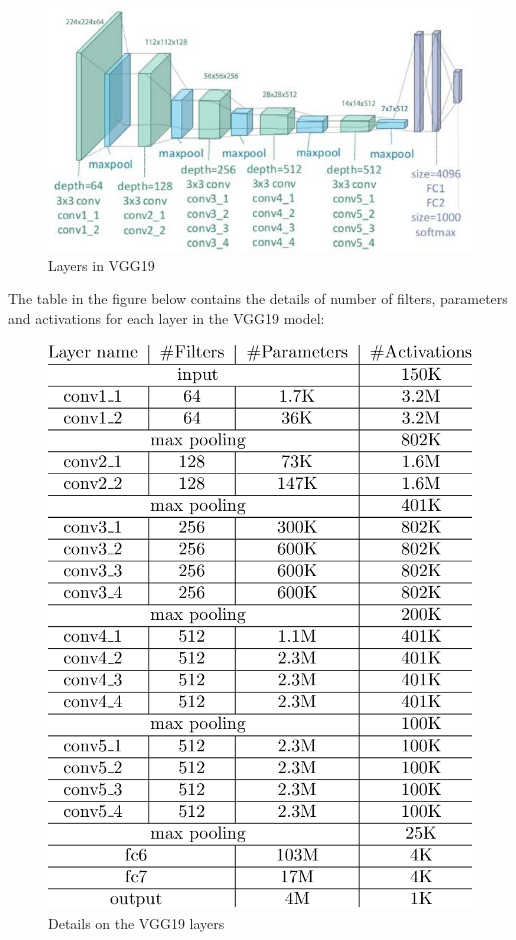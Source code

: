 \begin{figure}[h]
	\label{ss}
	\centering
	\includegraphics[width= 16 cm]{vgg19-layers.png}
	\caption{Layers in VGG19}
\end{figure}
\pagebreak
The table in the figure below contains the details of number of filters, parameters and activations for each layer in the VGG19 model:\\

\begin{figure}[H]
	\label{ss}
	\centering
	\includegraphics[width=20cm,height=15cm,keepaspectratio]{vgg19-arch-details.png}
	\caption{Details on the VGG19 layers}
\end{figure}

